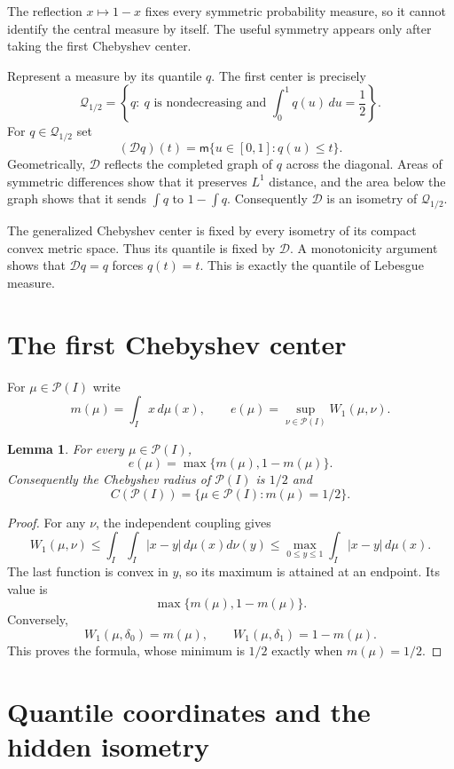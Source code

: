 \documentclass[11pt]{article}
\newtheorem{lemma}[theorem]{Lemma}
\newcommand{\Prob}{\mathcal P}
\newcommand{\Leb}{\mathsf m}
\newcommand{\Q}{\mathcal Q}
\newcommand{\D}{\mathcal D}
\newcommand{\W}{W_1}
\begin{document}
The reflection $x\mapsto1-x$ fixes every symmetric probability measure, so
it cannot identify the central measure by itself.  The useful symmetry
appears only after taking the first Chebyshev center.

Represent a measure by its quantile $q$.  The first center is precisely
\[
 \Q_{1/2}=\left\{q:\ q\text{ is nondecreasing and }
                    \int_0^1q(u)\,du=\frac12\right\}.
\]
For $q\in\Q_{1/2}$ set
\[
 (\D q)(t)=\Leb\{u\in[0,1]:q(u)\leq t\}.
\]
Geometrically, $\D$ reflects the completed graph of $q$ across the diagonal.
Areas of symmetric differences show that it preserves $L^1$ distance, and
the area below the graph shows that it sends $\int q$ to $1-\int q$.
Consequently $\D$ is an isometry of $\Q_{1/2}$.

The generalized Chebyshev center is fixed by every isometry of its compact
convex metric space.  Thus its quantile is fixed by $\D$.  A monotonicity
argument shows that $\D q=q$ forces $q(t)=t$.  This is exactly the quantile
of Lebesgue measure.

\section{The first Chebyshev center}

For $\mu\in\Prob(I)$ write
\[
 m(\mu)=\int_I x\,d\mu(x),\qquad
 e(\mu)=\sup_{\nu\in\Prob(I)}\W(\mu,\nu).
\]

\begin{lemma}\label{lem:firstcenter}
For every $\mu\in\Prob(I)$,
\[
 e(\mu)=\max\{m(\mu),1-m(\mu)\}.
\]
Consequently the Chebyshev radius of $\Prob(I)$ is $1/2$ and
\[
 C(\Prob(I))=\{\mu\in\Prob(I):m(\mu)=1/2\}.
\]
\end{lemma}

\begin{proof}
For any $\nu$, the independent coupling gives
\[
 \W(\mu,\nu)
 \leq \int_I\!\int_I |x-y|\,d\mu(x)d\nu(y)
 \leq \max_{0\leq y\leq1}\int_I|x-y|\,d\mu(x).
\]
The last function is convex in $y$, so its maximum is attained at an
endpoint.  Its value is
\[
 \max\{m(\mu),1-m(\mu)\}.
\]
Conversely,
\[
 \W(\mu,\delta_0)=m(\mu),\qquad
 \W(\mu,\delta_1)=1-m(\mu).
\]
This proves the formula, whose minimum is $1/2$ exactly when $m(\mu)=1/2$.
\end{proof}

\section{Quantile coordinates and the hidden isometry}
\end{document}
